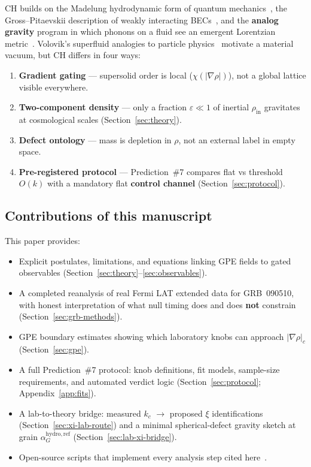 \documentclass[11pt,a4paper]{article}
\begin{document}
CH builds on the Madelung hydrodynamic form of quantum mechanics~\cite{Madelung1927}, the Gross--Pitaevskii description of weakly interacting BECs~\cite{Gross1961,Pitaevskii1961}, and the \textbf{analog gravity} program in which phonons on a fluid see an emergent Lorentzian metric~\cite{Unruh1981,Visser1995}.
Volovik's superfluid analogies to particle physics~\cite{Volovik2003} motivate a material vacuum, but CH differs in four ways:
\begin{enumerate}[label=(\roman*), leftmargin=*]
  \item \textbf{Gradient gating} --- supersolid order is local ($\chi(|\nabla\rho|)$), not a global lattice visible everywhere.
  \item \textbf{Two-component density} --- only a fraction $\varepsilon \ll 1$ of inertial $\rho_{\mathrm{in}}$ gravitates at cosmological scales (Section~\ref{sec:theory}).
  \item \textbf{Defect ontology} --- mass is depletion in $\rho$, not an external label in empty space.
  \item \textbf{Pre-registered protocol} --- Prediction~\#7 compares flat vs threshold $O(k)$ with a mandatory flat \textbf{control channel} (Section~\ref{sec:protocol}).
\end{enumerate}

\subsection{Contributions of this manuscript}

This paper provides:
\begin{itemize}[leftmargin=*]
  \item Explicit postulates, limitations, and equations linking GPE fields to gated observables (Section~\ref{sec:theory}--\ref{sec:observables}).
  \item A completed reanalysis of real Fermi LAT extended data for GRB~090510, with honest interpretation of what null timing does and does \textbf{not} constrain (Section~\ref{sec:grb-methods}).
  \item GPE boundary estimates showing which laboratory knobs can approach $|\nabla\rho|_c$ (Section~\ref{sec:gpe}).
  \item A full Prediction~\#7 protocol: knob definitions, fit models, sample-size requirements, and automated verdict logic (Section~\ref{sec:protocol}; Appendix~\ref{app:fits}).
  \item A lab-to-theory bridge: measured $k_c$ $\to$ proposed $\xi$ identifications (Section~\ref{sec:xi-lab-route}) and a minimal spherical-defect gravity sketch at grain $\alpha_G^{\mathrm{hydro,ref}}$ (Section~\ref{sec:lab-xi-bridge}).
  \item Open-source scripts that implement every analysis step cited here~\cite{CHSpaceFabric2026}.
\end{itemize}
\end{document}
